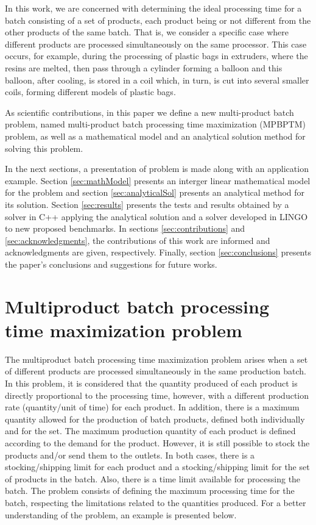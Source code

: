 \documentclass[preprint,12pt,authoryear]{elsarticle}
\begin{document}
In this work, we are concerned with determining the ideal processing time for a batch consisting of a set of products, each product being or not different from the other products of the same batch. That is, we consider a specific case where different products are processed simultaneously on the same processor. This case occurs, for example, during the processing of plastic bags in extruders, where the resins are melted, then pass through a cylinder forming a balloon and this balloon, after cooling, is stored in a coil which, in turn, is cut into several smaller coils, forming different models of plastic bags. 

As scientific contributions, in this paper we define a new multi-product batch problem, named multi-product batch processing time maximization (MPBPTM) problem, as well as a mathematical model and an analytical solution method for solving this problem.

In the next sections, a presentation of problem is made along with an application example. Section \ref{sec:mathModel} presents an interger linear mathematical model for the problem and section \ref{sec:analyticalSol} presents an analytical method for its solution. Section \ref{sec:results} presents the tests and results obtained by a solver in C++ applying the analytical solution and a solver developed in LINGO to new proposed benchmarks. In sections \ref{sec:contributions} and \ref{sec:acknowledgments}, the contributions of this work are informed and acknowledgments are given, respectively. Finally, section \ref{sec:conclusions} presents the paper's conclusions and suggestions for future works.

\section{Multiproduct batch processing time maximization problem}
\label{sec:MBPTMP}

The multiproduct batch processing time maximization problem arises when a set of different products are processed simultaneously in the same production batch. In this problem, it is considered that the quantity produced of each product is directly proportional to the processing time, however, with a different production rate (quantity/unit of time) for each product. In addition, there is a maximum quantity allowed for the production of batch products, defined both individually and for the set. The maximum production quantity of each product is defined according to the demand for the product. However, it is still possible to stock the products and/or send them to the outlets. In both cases, there is a stocking/shipping limit for each product and a stocking/shipping limit for the set of products in the batch. Also, there is a time limit available for processing the batch. The problem consists of defining the maximum processing time for the batch, respecting the limitations related to the quantities produced. For a better understanding of the problem, an example is presented below.
\end{document}
